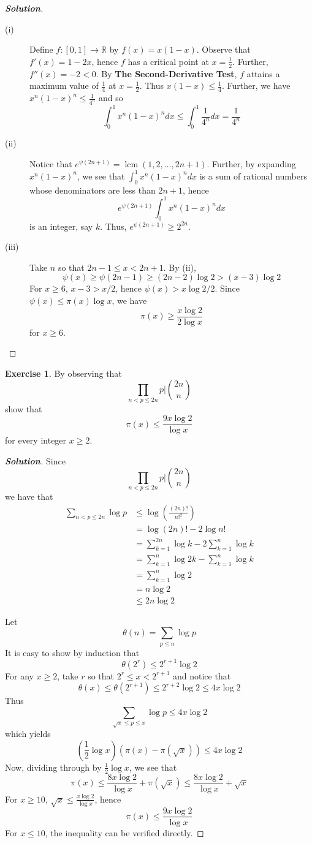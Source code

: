 \documentclass[12pt,leqno]{book}
\numberwithin{equation}{section}
\theoremstyle{definition}
\newtheorem{exer}[thm]{Exercise}
\newcommand{\lcm}{\operatorname{lcm}}
\newenvironment{Solution}{\begin{proof}[\textnormal{\textbf{Solution}}]}{\end{proof}}
\begin{document}
\begin{Solution}\indent
 \begin{description}
  \item [(i)] Define $f:[0,1]\to\mathbb{R}$ by $f(x)=x(1-x)$. Observe that $f'(x)=1-2x$, hence $f$ has a critical point at $x=\frac{1}{2}$. Further, $f''(x)=-2<0$. By \textbf{The Second-Derivative Test}, $f$ attains a maximum value of $\frac{1}{4}$ at $x=\frac{1}{2}$. Thus $x(1-x)\leq\frac{1}{4}$. Further, we have $x^n(1-x)^n\leq\frac{1}{4^n}$ and so \[\int_0^1x^n(1-x)^ndx\leq\int_0^1\frac{1}{4^n}dx=\frac{1}{4^n}\]
  \item [(ii)] Notice that $e^{\psi(2n+1)}=\lcm(1,2,\hdots,2n+1)$. Further, by expanding $x^n(1-x)^n$, we see that $\int_0^1x^n(1-x)^ndx$ is a sum of rational numbers whose denominators are less than $2n+1$, hence \[e^{\psi(2n+1)}\int_0^1x^n(1-x)^ndx\] is an integer, say $k$. Thus, $e^{\psi(2n+1)}\geq2^{2n}$.
  \item [(iii)] Take $n$ so that $2n-1\leq x<2n+1$. By (ii),\[\psi(x)\geq\psi(2n-1)\geq(2n-2)\log2>(x-3)\log2\] For $x\geq6$, $x-3>x/2$, hence $\psi(x)>x\log2/2$. Since $\psi(x)\leq\pi(x)\log x$, we have \[\pi(x)\geq\frac{x\log2}{2\log{x}}\] for $x\geq6$.
 \end{description}

\end{Solution}

\begin{exer}
By observing that \[\prod_{n<p\leq2n}p\Bigg|{2n\choose n}\] show that \[\pi(x)\leq\frac{9x\log 2}{\log x}\] for every integer $x\geq2$.
\end{exer}

\begin{Solution}
 Since \[\prod_{n<p\leq2n}p\Bigg|{2n\choose n}\] we have that \begin{align*}\sum_{n<p\leq 2n}\log p&\leq\log\left(\frac{(2n)!}{n!^2}\right)\\&=\log(2n)!-2\log n!\\&=\sum_{k=1}^{2n}\log k-2\sum_{k=1}^n\log k\\&=\sum_{k=1}^n\log2k-\sum_{k=1}^n\log k\\&=\sum_{k=1}^n\log2\\&=n\log2\\&\leq2n\log2\end{align*} 

Let \[\theta(n)=\sum_{p\leq n}\log p\] It is easy to show by induction that \[\theta(2^r)\leq 2^{r+1}\log2\] For any $x\geq2$, take $r$ so that $2^r\leq x<2^{r+1}$ and notice that \[\theta(x)\leq\theta(2^{r+1})\leq2^{r+2}\log2\leq4x\log2\] Thus \[\sum_{\sqrt{x}\leq p\leq x}\log p\leq4x\log2\] which yields \[\left(\frac{1}{2}\log x\right)\left(\pi(x)-\pi(\sqrt{x})\right)\leq4x\log2\] Now, dividing through by $\frac{1}{2}\log x$, we see that \[\pi(x)\leq\frac{8x\log2}{\log x}+\pi(\sqrt{x})\leq\frac{8x\log2}{\log x}+\sqrt{x}\] For $x\geq10$, $\sqrt{x}\leq\frac{x\log2}{\log x}$, hence \[\pi(x)\leq\frac{9x\log2}{\log x}\] For $x\leq10$, the inequality can be verified directly.
\end{Solution}
\end{document}
